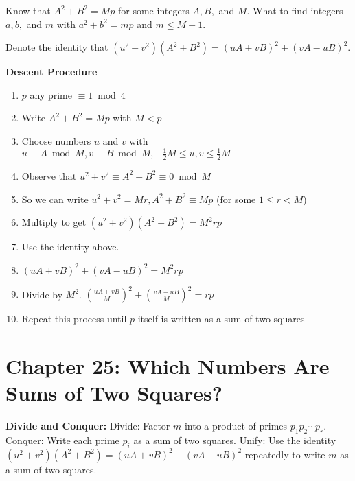 \documentclass[graybox]{svmult}
\begin{document}
Know that $A^2 +B^2 = Mp$ for some integers $A, B,$ and $M$. What to find integers $a, b,$ and $m$ with $a^2 +b^2 = mp$ and $m\leqslant M-1$.

Denote the identity that $(u^2 + v^2)(A^2+B^2) = (uA+vB)^2 + (vA-uB)^2.$

\textbf{Descent Procedure}
\begin{enumerate}
\item $p$ any prime $\equiv 1 \bmod 4$
\item Write $A^2 +B^2 = Mp$ with $M < p$
\item Choose numbers $u$ and $v$ with $u\equiv A \bmod M, v\equiv B \bmod M, -\frac{1}{2}M \leqslant u, v \leqslant \frac{1}{2}M$
\item Observe that $u^2 + v^2 \equiv A^2 + B^2 \equiv 0 \bmod M$
\item So we can write $u^2 + v^2 = Mr, A^2 +B^2 \equiv Mp$ (for some $1 \leqslant r < M$)
\item Multiply to get $(u^2 + v^2)(A^2+B^2)=M^2rp$
\item Use the identity above.
\item $(uA+vB)^2 +(vA-uB)^2 = M^2rp$
\item Divide by $M^2$. $\left(\frac{uA+vB}{M}\right)^2 + \left(\frac{vA-uB}{M}\right)^2 = rp$
\item Repeat this process until $p$ itself is written as a sum of two squares
\end{enumerate}

\section*{Chapter 25: Which Numbers Are Sums of Two Squares?}

\textbf{Divide and Conquer:}
Divide: Factor $m$ into a product of primes $p_1p_2\cdots p_r$.
Conquer: Write each prime $p_i$ as a sum of two squares.
Unify: Use the identity $(u^2+v^2)(A^2+B^2)=(uA+vB)^2+(vA-uB)^2$ repeatedly to write $m$ as a sum of two squares.
\end{document}
